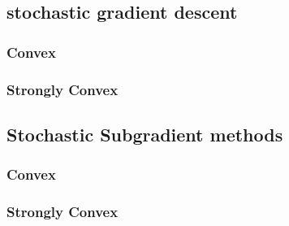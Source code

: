 \subsection{stochastic gradient descent}
\subsubsection{Convex}


\subsubsection{Strongly Convex}
% 

\subsection{Stochastic Subgradient methods}

\subsubsection{Convex}


\subsubsection{Strongly Convex}








